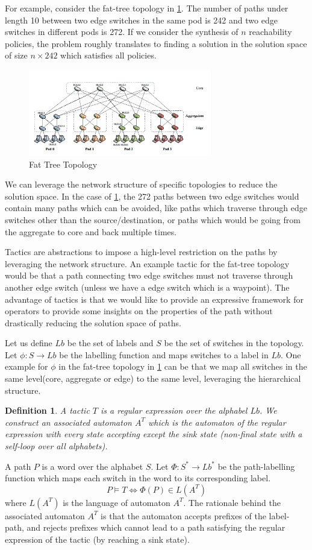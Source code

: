 \documentclass[]{sig}
\newtheorem{mydef}{Definition}
\begin{document}
For example, consider the fat-tree topology in \cref{fattree}. The number of paths under length 10 between two edge  switches in the same pod is 242 and two edge switches in different pods is 272. If we consider the synthesis of $n$ reachability policies, the problem roughly translates to finding a solution in the solution space of size $n \times 242$ which satisfies all policies. 
\begin{figure}[H]
	\includegraphics[width=8cm]{fattree.png}
	\caption{Fat Tree Topology}
	\label{fattree}
\end{figure}
We can leverage the network structure of specific topologies to reduce the solution space. In the case of \cref{fattree}, the 272 paths between two edge switches would contain many paths which can be avoided, like paths which traverse through edge switches other than the source/destination, or paths which would be  going from the aggregate to core and back multiple times. 

Tactics are abstractions to impose a high-level restriction on the paths by leveraging the network structure. An example tactic for the fat-tree topology would be that a path connecting two edge switches must not traverse through another edge switch (unless we have a edge switch which is a waypoint). The advantage of tactics is that we would like to provide an expressive framework for operators to provide some insights on the properties of the path without drastically reducing the solution space of paths. 

Let us define $Lb$ be the set of labels and $S$ be the set of switches in the topology. Let $\phi : S \rightarrow Lb$ be the labelling function and maps switches to a label in $Lb$. One example for $\phi$ in the fat-tree topology in \cref{fattree} can be that we map all switches in the same level(core, aggregate or edge) to the same level, leveraging the hierarchical structure.
\begin{mydef}
	A tactic $T$ is a regular expression over the alphabel $Lb$. We construct an associated automaton $A^T$ which is the automaton of the regular expression with every state accepting except the sink state (non-final state with a self-loop over all alphabets).
\end{mydef}
A path $P$ is a word over the alphabet $S$. Let $\Phi : S^* \rightarrow Lb^*$ be the path-labelling function which maps each switch in the word to its corresponding label.  
\begin{equation}
	P \models T \iff  \Phi(P) \in L(A^T) 
\end{equation}
where $L(A^T)$ is the language of automaton $A^T$. The rationale behind the associated automaton $A^T$ is that the automaton accepts prefixes of the label-path, and rejects prefixes which cannot lead to a path satisfying the regular expression of the tactic (by reaching a sink state). 
\end{document}
